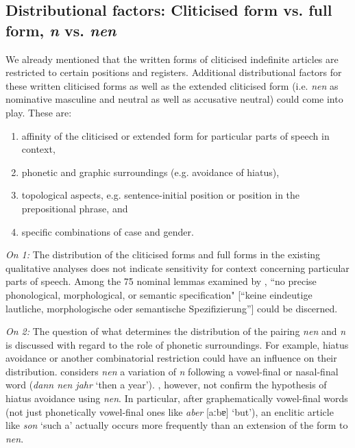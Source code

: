 \subsection[Distributional factors]{Distributional factors: Cliticised form vs. full form, \textit{n} vs. \textit{nen}}
\label{subsec:14distributionalFactors}

We already mentioned that the written forms of cliticised indefinite articles are restricted to certain positions and registers.
Additional distributional factors for these written cliticised forms as well as the extended cliticised form (i.e. \textit{nen} as nominative masculine and neutral as well as accusative neutral) could come into play.
These are:

\begin{enumerate}
	\item affinity of the cliticised or extended form for particular parts of speech in context,
	\item phonetic and graphic surroundings (e.g. avoidance of hiatus),
	\item topological aspects, e.g. sentence-initial position or position in the prepositional phrase, and
	\item specific combinations of case and gender.
\end{enumerate}

\textit{On 1:}
The distribution of the cliticised forms and full forms in the existing qualitative analyses does not indicate sensitivity for context concerning particular parts of speech.
Among the 75 nominal lemmas examined by \citet[182]{Vogel2006}, ``no precise phonological, morphological, or semantic specification" [``keine eindeutige lautliche, morphologische oder semantische Spezifizierung''] could be discerned.

\textit{On 2:}
The question of what determines the distribution of the pairing \textit{nen} and \textit{n} is discussed with regard to the role of phonetic surroundings. 
For example, hiatus avoidance or another combinatorial restriction could have an influence on their distribution.
\citet[7]{Burri2003} considers \textit{nen} a variation of \textit{n} following a vowel-final or nasal-final word (\textit{dann nen jahr} `then a year').
\citet[185]{Vogel2006}, however, not confirm the hypothesis of hiatus avoidance using \textit{nen}.
In particular, after graphematically vowel-final words (not just phonetically vowel-final ones like \textit{aber} [aːbɐ] `but'), an enclitic article like \textit{son} `such a' actually occurs more frequently than an extension of the form to \textit{nen}.

